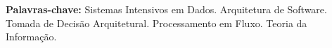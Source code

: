 \begin{resumo}
\textbf{Palavras-chave:} Sistemas Intensivos em Dados. Arquitetura de Software. Tomada de Decisão Arquitetural. Processamento em Fluxo. Teoria da Informação.


\end{resumo}
